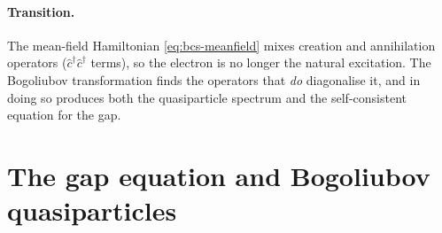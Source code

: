 \paragraph{Transition.}
The mean-field Hamiltonian \cref{eq:bcs-meanfield} mixes creation and
annihilation operators ($\hat c^\dagger\hat c^\dagger$ terms), so the
electron is no longer the natural excitation. The Bogoliubov
transformation finds the operators that \emph{do} diagonalise it, and
in doing so produces both the quasiparticle spectrum and the
self-consistent equation for the gap.

\section{The gap equation and Bogoliubov quasiparticles}
\label{sec:gap-bogoliubov}

